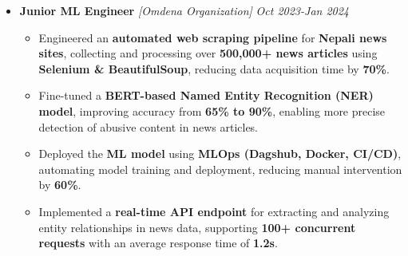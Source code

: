 \documentclass[a4paper,10pt]{article}
\begin{document}
\begin{itemize}

\vspace{-1mm}
\item {\bf Junior ML Engineer } \textit{[Omdena Organization]}
\textit{\hfill 
{Oct 2023-Jan 2024}
}
\vspace{-1mm}

\begin{itemize}

\item Engineered an \textbf{automated web scraping pipeline} for \textbf{Nepali news sites}, collecting and processing over \textbf{500,000+ news articles} using \textbf{Selenium \& BeautifulSoup}, reducing data acquisition time by \textbf{70\%}.

\item Fine-tuned a \textbf{BERT-based Named Entity Recognition (NER) model}, improving accuracy from \textbf{65\% to 90\%}, enabling more precise detection of abusive content in news articles.

\item Deployed the \textbf{ML model} using \textbf{MLOps (Dagshub, Docker, CI/CD)}, automating model training and deployment, reducing manual intervention by \textbf{60\%}.

\item Implemented a \textbf{real-time API endpoint} for extracting and analyzing entity relationships in news data, supporting \textbf{100+ concurrent requests} with an average response time of \textbf{1.2s}.

\vspace{-1mm}

\end{itemize}
\end{itemize}
\end{document}
